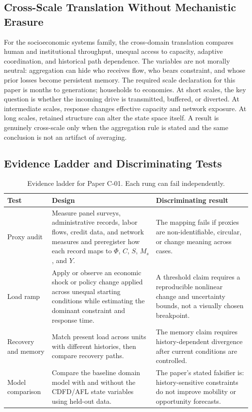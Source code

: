 \documentclass[11pt,a4paper]{article}
\begin{document}
\subsection{Cross-Scale Translation Without Mechanistic Erasure}

For the socioeconomic systems family, the cross-domain translation compares human and institutional throughput, unequal access to capacity, adaptive coordination, and historical path dependence. The variables are not morally neutral: aggregation can hide who receives flow, who bears constraint, and whose prior losses become persistent memory. \cite{BarabasiAlbert1999,WattsStrogatz1998,Holling1973,Shannon1948}
The required scale declaration for this paper is months to generations; households to economies. At short
scales, the key question is whether the incoming drive is transmitted,
buffered, or diverted. At intermediate scales, response changes effective
capacity and network exposure. At long scales, retained structure can alter the
state space itself. A result is genuinely cross-scale only when the aggregation
rule is stated and the same conclusion is not an artifact of averaging.

\subsection{Evidence Ladder and Discriminating Tests}

\begin{table}[htbp]
\centering
\small
\caption{Evidence ladder for Paper C-01. Each rung can fail independently.}
\begin{tabularx}{\textwidth}{|p{}|X|X|}
\hline
\textbf{Test} & \textbf{Design} & \textbf{Discriminating result} \\
\hline
Proxy audit & Measure panel surveys, administrative records, labor flows, credit data, and network measures and preregister how each record maps to $\Phi$, $C$, $S$, $M_s$, and $Y$. & The mapping fails if proxies are non-identifiable, circular, or change meaning across cases. \\
\hline
Load ramp & Apply or observe an economic shock or policy change applied across unequal starting conditions while estimating the dominant constraint and response time. & A threshold claim requires a reproducible nonlinear change and uncertainty bounds, not a visually chosen breakpoint. \\
\hline
Recovery and memory & Match present load across units with different histories, then compare recovery paths. & The memory claim requires history-dependent divergence after current conditions are controlled. \\
\hline
Model comparison & Compare the baseline domain model with and without the CDFD/AFL state variables using held-out data. & The paper's stated falsifier is: history-sensitive constraints do not improve mobility or opportunity forecasts. \\
\hline
\end{tabularx}
\end{table}
\end{document}
